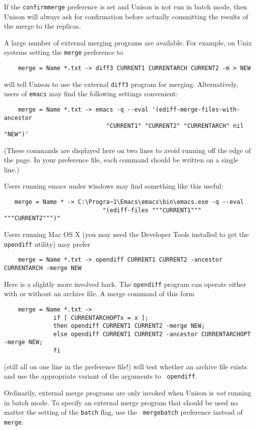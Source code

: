 \documentclass{article}
\begin{document}
If the \verb|confirmmerge| preference is set and Unison is not run in
batch mode, then Unison will always ask for confirmation before
actually committing the results of the merge to the replicas.

A large number of external merging programs are available.  
For example, on Unix systems setting the \verb|merge| preference to
\begin{verbatim}
    merge = Name *.txt -> diff3 CURRENT1 CURRENTARCH CURRENT2 -m > NEW
\end{verbatim}
\noindent
will tell Unison to use the external \verb|diff3| program for merging.  
%
Alternatively, users of \verb|emacs| may find the following settings convenient:
\begin{verbatim}
    merge = Name *.txt -> emacs -q --eval '(ediff-merge-files-with-ancestor 
                             "CURRENT1" "CURRENT2" "CURRENTARCH" nil "NEW")' 
\end{verbatim}
\noindent
(These commands are displayed here on two lines to avoid running off the
edge of the page.  In your preference file, each command should be written on a
single line.) 

Users running emacs under windows may find something like this useful:
\begin{verbatim}
   merge = Name * -> C:\Progra~1\Emacs\emacs\bin\emacs.exe -q --eval
                            "(ediff-files """CURRENT1""" """CURRENT2""")"
\end{verbatim}

Users running Mac OS X (you may need the Developer Tools installed to get
the {\tt opendiff} utility) may prefer
\begin{verbatim}
    merge = Name *.txt -> opendiff CURRENT1 CURRENT2 -ancestor CURRENTARCH -merge NEW
\end{verbatim}
Here is a slightly more involved hack.  The {\tt opendiff} program can
operate either with or without an archive file.  A merge command of this
form 
\begin{verbatim}
    merge = Name *.txt -> 
              if [ CURRENTARCHOPTx = x ]; 
              then opendiff CURRENT1 CURRENT2 -merge NEW; 
              else opendiff CURRENT1 CURRENT2 -ancestor CURRENTARCHOPT -merge NEW; 
              fi
\end{verbatim}
(still all on one line in the preference file!) will test whether an archive
file exists and use the appropriate variant of the arguments to {\tt
  opendiff}. 

Ordinarily, external merge programs are only invoked when Unison is {\em
  not} running in batch mode.  To specify an external merge program that
should be used no matter the setting of the {\tt batch} flag, use the {\tt
  mergebatch} preference instead of {\tt merge}.
\end{document}
